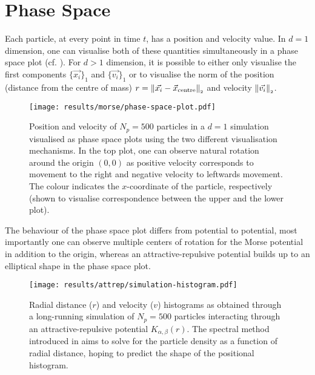 \section{Phase Space}
Each particle, at every point in time $t$, has a position and velocity value.
In $d=1$ dimension, one can visualise both of these quantities simultaneously in a phase space plot (cf. ).
For $d > 1$ dimension, it is possible to either only visualise the first components $\{\vec{x_i}\}_1$ and $\{\vec{v_i}\}_1$ or to visualise the norm of the position (distance from the centre of mass) $r = \left\lVert\vec{x_i} - \vec{x}_{\text{centre}}\right\rVert_{\scriptscriptstyle 2}$ and velocity $\left\lVert\vec{v_i}\right\rVert_{\scriptscriptstyle 2}$.

\begin{figure}[H]
  \centering
  \texttt{[image: results/morse/phase-space-plot.pdf]}
  \caption[Phase Space Plots]{Position and velocity of $N_p = 500$ particles in a $d=1$ simulation visualised as phase space plots using the two different visualisation mechanisms. In the top plot, one can observe natural rotation around the origin $(0, 0)$ as positive velocity corresponds to movement to the right and negative velocity to leftwards movement. The colour indicates the $x$-coordinate of the particle, respectively (shown to visualise correspondence between the upper and the lower plot).}
  \label{fig:phase-space-plot}
\end{figure}

The behaviour of the phase space plot differs from potential to potential, most importantly one can observe multiple centers of rotation for the Morse potential in addition to the origin, whereas an attractive-repulsive potential builds up to an elliptical shape in the phase space plot.

\begin{figure}[H]
  \centering
  \texttt{[image: results/attrep/simulation-histogram.pdf]}
  \caption[Radial distance and velocity histograms of simulation output in 1D]{Radial distance ($r$) and velocity ($v$) histograms as obtained through a long-running simulation of $N_p = 500$ particles interacting through an attractive-repulsive potential $K_{\alpha, \beta}(r)$. The spectral method introduced in  aims to solve for the particle density as a function of radial distance, hoping to predict the shape of the positional histogram.}
  \label{fig:simulation-histogram}
\end{figure}

